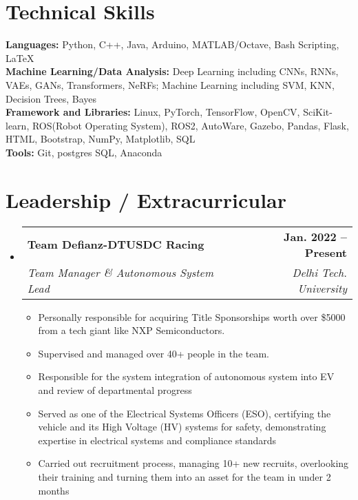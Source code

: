 \documentclass[letterpaper,11pt]{article}
\makeatletter
\newcommand{\resumeItem}[1]{
  \item\small{
    {#1 \vspace{-2pt}}
  }
}
\newcommand{\resumeSubheading}[4]{
  \vspace{-2pt}\item
    \begin{tabular*}{1.0\textwidth}[t]{l@{\extracolsep{\fill}}r}
      \textbf{#1} & \textbf{\small #2} \\
      \textit{\small#3} & \textit{\small #4} \\
    \end{tabular*}\vspace{-7pt}
}
\newcommand{\resumeSubHeadingListStart}{\begin{itemize}[leftmargin=0.0in, label={}]}
\newcommand{\resumeSubHeadingListEnd}{\end{itemize}}
\newcommand{\resumeItemListStart}{\begin{itemize}}
\newcommand{\resumeItemListEnd}{\end{itemize}\vspace{-5pt}}
\makeatother
\begin{document}
\section{Technical Skills}
 \begin{itemize}[leftmargin=0.15in, label={}]
    \setlength\itemsep{5em} %
    \small{\item{
        \textbf{Languages:}{ Python, C++, Java, Arduino, MATLAB/Octave, Bash Scripting, \LaTeX} \\
      \vspace{3pt}
         \textbf{Machine Learning/Data Analysis:}{ Deep Learning including CNNs, RNNs, VAEs, GANs, Transformers, NeRFs; Machine Learning including SVM, KNN, Decision Trees, Bayes } \\ 
     \vspace{3pt}
        \textbf{Framework and Libraries:}{ Linux, PyTorch, TensorFlow, OpenCV, SciKit-learn, ROS(Robot Operating System), ROS2, AutoWare, Gazebo, Pandas, Flask, HTML, Bootstrap, NumPy, Matplotlib, SQL} \\
     \vspace{3pt}
        \textbf{Tools:}{ Git, postgres SQL, Anaconda} \\
    }}
 \end{itemize}


\section{Leadership / Extracurricular}
    \resumeSubHeadingListStart
        \resumeSubheading{Team Defianz-DTUSDC Racing}{Jan. 2022 -- Present}{Team Manager \& Autonomous System Lead}{Delhi Tech. University}
            \resumeItemListStart
                \resumeItem{Personally responsible for acquiring Title Sponsorships worth over \$5000 from a tech giant like NXP Semiconductors.}
                \resumeItem{Supervised and managed over 40+ people in the team.}
                \resumeItem{Responsible for the system integration of autonomous system into EV and  review of departmental progress}
                \resumeItem{Served as one of the Electrical Systems Officers (ESO), certifying the vehicle and its High Voltage (HV) systems for safety, demonstrating expertise in electrical systems and compliance standards}
                \resumeItem{Carried out recruitment process, managing 10+ new recruits, overlooking their training and turning them into an asset for the team in under 2 months}
            \resumeItemListEnd


        
    \resumeSubHeadingListEnd
\end{document}
